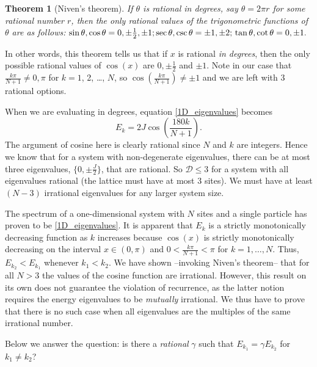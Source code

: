 \documentclass[a4paper, 10pt]{article}
\theoremstyle{plain}
\newtheorem*{theorem*}{Theorem}
\begin{document}
\begin{theorem*}[Niven's theorem]
    If $\theta$ is rational in degrees, say $\theta=2\pi r$ for some rational
    number $r$, then the only rational values of the trigonometric functions of
    $\theta$ are as follows: $\sin \theta, \cos \theta =0, \pm\frac{1}{2},\pm 1;
    \sec\theta, \csc\theta=\pm1,\pm2; \\ \tan\theta,\cot\theta=0,\pm1.$
\end{theorem*}
In other words, this theorem tells us that if $x$ is rational \textit{in
degrees}, then the only possible rational values of $\cos(x)$ are $0, \pm
\frac{1}{2}$ and $\pm 1$. Note in our case that $\frac{k\pi}{N+1}\neq 0, \pi$
for $k=1$, 2, \dots, $N$, so $\cos{\!(\frac{k\pi}{N+1})} \neq \pm 1$ and we are
left with 3 rational options.

When we are evaluating in degrees, equation \eqref{1D_eigenvalues} becomes
\begin{equation}
    E_{k} = 2 J \cos{\!\left ( \frac{180k}{N+1} \right )}.
\end{equation}
The argument of cosine here is clearly rational since $N$ and $k$ are integers.
Hence we know that for a system with non-degenerate eigenvalues, there can be at
most three eigenvalues, $\lbrace 0, \pm \frac{J}{2} \rbrace$, that are rational.
So $\mathcal{D} \leq 3$ for a system with all eigenvalues rational (the lattice
must have at most 3 sites). We must have at least $(N-3)$ irrational eigenvalues
for any larger system size.

The spectrum of a one-dimensional system with $N$ sites and a single particle
has proven to be \eqref{1D_eigenvalues}. It is apparent that $E_{k}$ is a
strictly monotonically decreasing function as $k$ increases because $\cos(x)$ is
strictly monotonically decreasing on the interval $x\in(0,\pi)$ and $0 <
\frac{k\pi}{N+1} < \pi$ for $k=1,\dots,N$. Thus, $E_{k_{2}} < E_{k_{1}}$
whenever $k_{1} < k_{2}$. We have shown --invoking Niven's theorem-- that for
all $N>3$ the values of the cosine function are irrational. However, this result
on its own does not guarantee the violation of recurrence, as the latter notion
requires the energy eigenvalues to be {\emph{mutually}} irrational. We thus have
to prove that there is no such case when all eigenvalues are the multiples of
the same irrational number.

Below we answer the question: is there a {\emph{rational}} $\gamma$ such
that $E_{k_{1}} = \gamma E_{k_{2}}$ for $k_{1} \ne k_{2}$?
\end{document}
